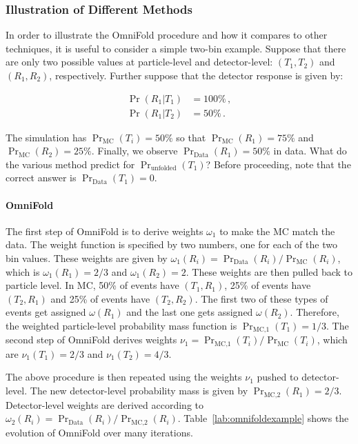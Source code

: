 \documentclass[NOTE, atlasdraft=true, texlive=2016, UKenglish]{\ATLASLATEXPATH atlasdoc}
\begin{document}
\subsubsection{Illustration of Different Methods}

In order to illustrate the OmniFold procedure and how it compares to other techniques, it is useful to consider a simple two-bin example.  Suppose that there are only two possible values at particle-level and detector-level: $(T_1,T_2)$ and $(R_1,R_2)$, respectively.  Further suppose that the detector response is given by:

\begin{align}
\Pr(R_1|T_1)&=100\%\,,\\
\Pr(R_1|T_2)&=50\%\,.
\end{align}

The simulation has $\Pr_\text{MC}(T_i)=50\%$ so that $\Pr_\text{MC}(R_1)=75\%$ and $\Pr_\text{MC}(R_2)=25\%$.   Finally, we observe $\Pr_\text{Data}(R_1)=50\%$ in data.  What do the various method predict for $\Pr_\text{unfolded}(T_1)$?   Before proceeding, note that the correct answer is $\Pr_\text{Data}(T_1)=0$.

\paragraph{OmniFold}  The first step of OmniFold is to derive weights $\omega_1$ to make the MC match the data.  The weight function is specified by two numbers, one for each of the two bin values.  These weights are given by $\omega_1(R_i)=\Pr_\text{Data}(R_i)/\Pr_\text{MC}(R_i)$, which is $\omega_1(R_1)=2/3$ and $\omega_1(R_2)=2$.  These weights are then pulled back to particle level.  In MC, 50\% of events have $(T_1,R_1)$, 25\% of events have $(T_2,R_1)$ and 25\% of events have $(T_2,R_2)$.   The first two of these types of events get assigned $\omega(R_1)$ and the last one gets assigned $\omega(R_2)$.  Therefore, the weighted particle-level probability mass function is $\Pr_\text{MC,1}(T_1)=1/3$.  The second step of OmniFold derives weights $\nu_1=\Pr_\text{MC,1}(T_i)/\Pr_\text{MC}(T_i)$, which are $\nu_1(T_1)=2/3$ and $\nu_1(T_2)=4/3$.

The above procedure is then repeated using the weights $\nu_1$ pushed to detector-level.  The new detector-level probability mass is given by $\Pr_\text{MC,2}(R_1)=2/3$.  Detector-level weights are derived according to $\omega_2(R_i)=\Pr_\text{Data}(R_i)/\Pr_\text{MC,2}(R_i)$.  Table~\ref{lab:omnifoldexample} shows the evolution of OmniFold over many iterations.
\end{document}

